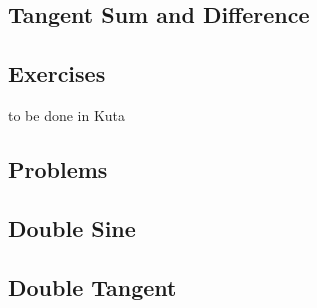 \subsection{Tangent Sum and Difference}
\newpage
\subsection{Exercises}
to be done in Kuta


{}
\subsection{Problems}
\noindent{}
\subsection{Double Sine}
\subsection{Double Tangent}
